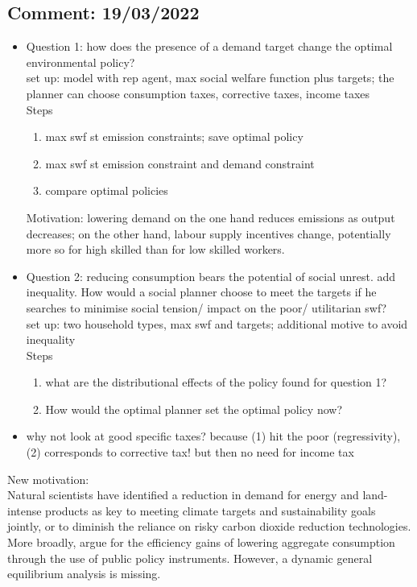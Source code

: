 

\subsection*{Comment: 19/03/2022}
\begin{itemize}
	\item Question 1: how does the presence of a demand target change the optimal environmental policy?
	\\
	set up:  model with rep agent, max social welfare function plus targets;  the planner can choose consumption taxes, corrective taxes, income taxes
	\\ Steps
	\begin{enumerate}
		\item max swf st emission constraints; save optimal policy
		\item max swf st emission constraint and demand constraint
		\item compare optimal policies
	\end{enumerate}
Motivation: lowering demand on the one hand reduces emissions as output decreases; on the other hand, labour supply incentives change, potentially more so for high skilled than for low skilled workers. 
	\item Question 2: reducing consumption bears the potential of social unrest. \ar add inequality. How would a social planner choose to meet the targets if he searches to minimise social tension/ impact on the poor/ utilitarian swf? 
	\\
	set up: two household types, max swf and targets; additional motive to avoid inequality
	\\
	Steps
	\begin{enumerate}
	\item what are the distributional effects of the policy found for question 1?
	\item How would the optimal planner set the optimal policy now? 
	\end{enumerate}
\item why not look at good specific taxes? \ar because (1) hit the poor (regressivity), (2) corresponds to corrective tax! \ar but then no need for income tax
\end{itemize}

New motivation: \\
Natural scientists have identified a reduction in demand for energy and land-intense products as key to meeting climate targets and sustainability goals jointly, or to diminish the reliance on risky carbon dioxide reduction technologies. More broadly, \cite{Arrow2004AreMuch} argue for the efficiency gains of lowering aggregate consumption through the use of public policy instruments. 
However, a dynamic general equilibrium analysis is missing. 

